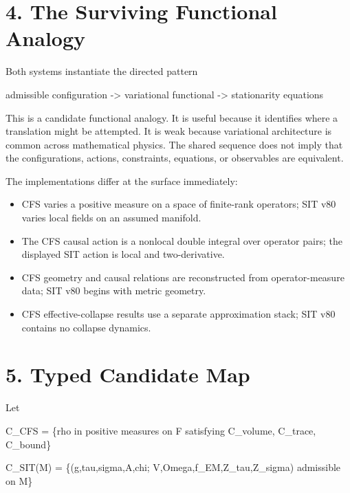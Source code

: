 \documentclass[
  american,
  11pt,
  letterpaper,
]{article}
\newenvironment{Shaded}{}{}
\newcommand{\NormalTok}[1]{#1}
\providecommand{\tightlist}{%
  \setlength{\itemsep}{0pt}\setlength{\parskip}{0pt}}
\begin{document}
\section{4. The Surviving Functional Analogy}\label{the-surviving-functional-analogy}

Both systems instantiate the directed pattern

\begin{Shaded}
\begin{Highlighting}[]
\NormalTok{admissible configuration {-}\textgreater{} variational functional {-}\textgreater{} stationarity equations}
\end{Highlighting}
\end{Shaded}

This is a candidate functional analogy. It is useful because it identifies where a translation might be attempted. It is weak because variational architecture is common across mathematical physics. The shared sequence does not imply that the configurations, actions, constraints, equations, or observables are equivalent.

The implementations differ at the surface immediately:

\begin{itemize}
\tightlist
\item
  CFS varies a positive measure on a space of finite-rank operators; SIT v80 varies local fields on an assumed manifold.
\item
  The CFS causal action is a nonlocal double integral over operator pairs; the displayed SIT action is local and two-derivative.
\item
  CFS geometry and causal relations are reconstructed from operator-measure data; SIT v80 begins with metric geometry.
\item
  CFS effective-collapse results use a separate approximation stack; SIT v80 contains no collapse dynamics.
\end{itemize}

\section{5. Typed Candidate Map}\label{typed-candidate-map}

Let

\begin{Shaded}
\begin{Highlighting}[]
\NormalTok{C\_CFS = \{rho in positive measures on F satisfying C\_volume, C\_trace, C\_bound\}}

\NormalTok{C\_SIT(M) = \{(g,tau,sigma,A,chi; V,Omega,f\_EM,Z\_tau,Z\_sigma) admissible on M\}}
\end{Highlighting}
\end{Shaded}
\end{document}

